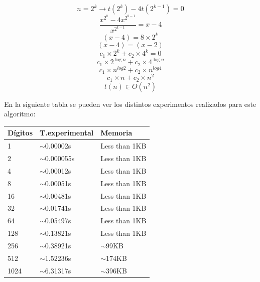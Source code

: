\documentclass{article}
\begin{document}
$$n = 2^k \rightarrow t(2^k)-4t (2^{k-1})=0$$
$$\frac{x^{2^k}-4x^{2^{k-1}}}{x^{2^{k-1}}} = x-4 $$
$$ (x-4)=8 \times 2^k $$
$$ (x-4)=(x-2) $$
$$ c_1\times 2^k+c_2 \times 4^k=0 $$
$$ c_1 \times 2^{\log n}+c_2 \times 4^{\log n} $$
$$ c_1 \times n^{log 2}+c_2 \times n^{log 4} $$
$$ c_1 \times n+c_2 \times n^2 $$
$$ t(n)\in O(n^2) $$

\begin{center}
En la siguiente tabla se pueden ver los distintos experimentos realizados para este algoritmo: 
\end{center}
\label{dyv-table}
\begin{adjustbox}{width=0.5\textwidth,center=\textwidth}
\begin{tabular}{|l|l|l|}
\hline
{Dígitos} 					   & {T.experimental} 					   	& {Memoria} 					 \\ \hline
1                              & $\sim$0.00002s                         & Less than 1KB                  \\ \hline
2                              & $\sim$0.000055s                        & Less than 1KB                  \\ \hline
4                              & $\sim$0.00012s                        	& Less than 1KB                  \\ \hline
8                              & $\sim$0.00051s                        	& Less than 1KB                  \\ \hline
16                             & $\sim$0.00481s                        	& Less than 1KB                  \\ \hline
32                             & $\sim$0.01741s                       	& Less than 1KB                  \\ \hline
64                             & $\sim$0.05497s                        	& Less than 1KB                  \\ \hline
128                            & $\sim$0.13821s                        	& Less than 1KB                  \\ \hline
256                            & $\sim$0.38921s                       	& $\sim$99KB                     \\ \hline
512                            & $\sim$1.52236s                       	& $\sim$174KB                    \\ \hline
1024                           & $\sim$6.31317s                        	& $\sim$396KB                    \\ \hline
\end{tabular}
\end{adjustbox}
\end{document}
